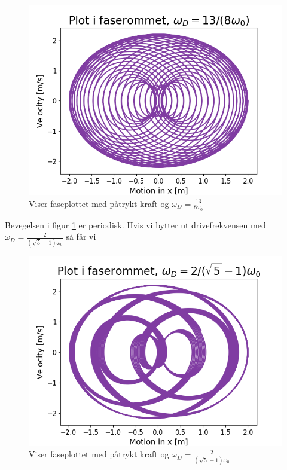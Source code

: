 \documentclass[norsk,a4paper,12pt]{article}
\begin{document}
\begin{figure}[h]
\begin{center}
\includegraphics[scale=0.8]{Oppgave4del1.png}
\caption{Viser faseplottet med påtrykt kraft og $\omega_D = \frac{13}{8\omega_0}$}
\label{fig:faseplot4del1}
\end{center}
\end{figure}
Bevegelsen i figur \ref{fig:faseplot4del1} er periodisk. Hvis vi bytter ut drivefrekvensen med $\omega_D = \frac{2}{\left(\sqrt{5}-1 \right)\omega_0}$ så får vi 


\begin{figure}[h]
\begin{center}
\includegraphics[scale=0.8]{Oppgave4del2.png}
\caption{Viser faseplottet med påtrykt kraft og $\omega_D = \frac{2}{\left(\sqrt{5}-1 \right)\omega_0}$}
\label{fig:faseplot4del2}
\end{center}
\end{figure}
\end{document}
